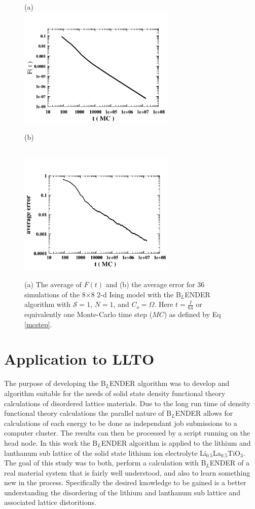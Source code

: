 \documentclass[aps,prl,reprint,superscriptaddress,showkeys]{revtex4-1}
\begin{document}
\begin{figure}
(a)\\
\includegraphics[width=7.5cm]{./figures/Avg_F_8X8.png}
\centerline{(b)}\\
\includegraphics[width=7.5cm]{./figures/Avg_error_8X8.png}
\caption{ (a) The average of $F(t)$ and (b) the average error for 36 simulations of the 8$\times$8 2-d Ising model with the B$_L$ENDER algorithm with $\mathcal{S}=1$, $N=1$, and $C_o = \Omega$. Here $t = \frac{I}{64}$ or equivalently one Monte-Carlo time step ($MC$) as defined by Eq \ref{mcstep}.\label{FtandA} }
\end{figure}

\section{Application to LLTO}
The purpose of developing the B$_L$ENDER algorithm was to develop and algorithm suitable for the needs of solid state density functional theory calculations of disordered lattice materials.  Due to the long run time of density functional theory calculations  the parallel nature of B$_L$ENDER allows for calculations of each energy to be done as independant job submissions to a computer cluster. The results can then be processed by a script running on the head node.  In this work the B$_L$ENDER algorithm is applied to the lithium and lanthanum sub lattice of the solid state lithium ion electrolyte  Li$_{0.5}$La$_{0.5}$TiO$_{3}$. The goal of this study was to both, perform a calculation with B$_L$ENDER of a real material system that is fairly well understood, and also to learn something new in the process.  Specifically the desired knowledge to be gained is a better understanding the disordering of the lithium and lanthanum sub lattice and associated lattice distoritions. 
\end{document}

